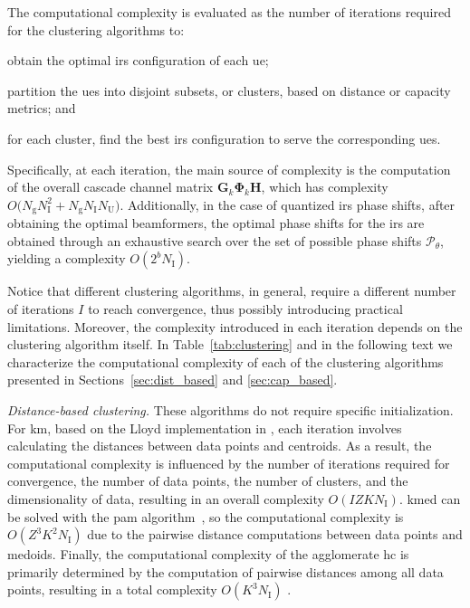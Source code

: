 The computational complexity is evaluated as the number of iterations required for the clustering algorithms to: \begin{enumerate*}[label=(\textit{\roman*})] 
\item obtain the optimal \gls{irs} configuration of each \gls{ue};
\item partition the \glspl{ue} into disjoint subsets, or clusters, based on distance or capacity metrics; and 
\item for each cluster, find the best \gls{irs} configuration to serve the corresponding \glspl{ue}.
\end{enumerate*}

Specifically, at each iteration, the main source of complexity is the computation of the overall cascade channel matrix $\bm{G}_k \bm{\Phi}_k \bm{H}$, which has complexity $O\big(N_{\mathrm g}N_{\mathrm I}^2 + N_{\mathrm g}N_{\mathrm I}N_{\mathrm U}\big)$.
Additionally, in the case of quantized \gls{irs} phase shifts, after obtaining the optimal beamformers, the optimal phase shifts for the \gls{irs} are obtained through an exhaustive search over the set of possible phase shifts $\mathcal{P}_{\theta}$, yielding a complexity $O(2^b N_{\mathrm I})$.

Notice that different clustering algorithms, in general, require a different number of iterations $I$ to reach convergence, thus possibly introducing practical limitations. Moreover, the complexity introduced in each iteration depends on the clustering algorithm itself. 
In Table~\ref{tab:clustering} and in the following text we characterize the computational complexity of each of the clustering algorithms presented in Sections~\ref{sec:dist_based} and \ref{sec:cap_based}.

\emph{Distance-based clustering.}
These algorithms do not require specific initialization.
For \gls{km}, based on the Lloyd implementation in \cite{Kmeans}, each iteration involves calculating the distances between data points and centroids. As a result, the computational complexity is influenced by the number of iterations required for convergence, the number of data points, the number of clusters, and the dimensionality of data, resulting in an overall complexity $O(IZKN_{\mathrm I})$.  
\gls{kmed} can be solved with the \gls{pam} algorithm~\cite{van2003new}, so the computational complexity is $O(Z^3K^2N_{\mathrm I})$ due to the pairwise distance computations between data points and medoids. Finally, the computational complexity of the agglomerate \gls{hc} is primarily determined by the computation of pairwise distances among all data points, resulting in a total complexity $O(K^3N_{\mathrm I})$ \cite{xu2015comprehensive}.

